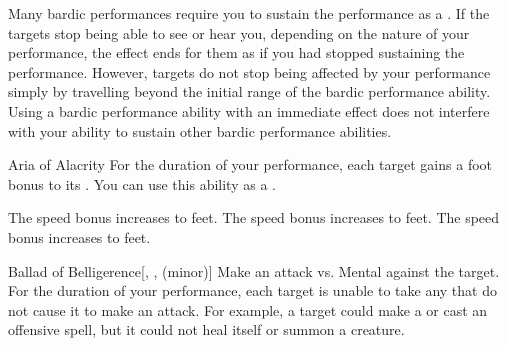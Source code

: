         Many bardic performances require you to sustain the performance as a .
        If the targets stop being able to see or hear you, depending on the nature of your performance, the effect ends for them as if you had stopped sustaining the performance.
        However, targets do not stop being affected by your performance simply by travelling beyond the initial range of the bardic performance ability.
        Using a bardic performance ability with an immediate effect does not interfere with your ability to sustain other bardic performance abilities.
        {
            \begin{freeability}{Aria of Alacrity}
                For the duration of your performance, each target gains a  foot bonus to its .
                You can use this ability as a .

                \rankline
                 The speed bonus increases to  feet.
                 The speed bonus increases to  feet.
                 The speed bonus increases to  feet.
            \end{freeability}

            \begin{freeability}{Ballad of Belligerence}[, ,  (minor)]
                Make an attack vs. Mental against the target.
                \hit For the duration of your performance, each target is unable to take any  that do not cause it to make an attack.
                For example, a target could make a  or cast an offensive spell, but it could not heal itself or summon a creature.


\end{freeability}}
